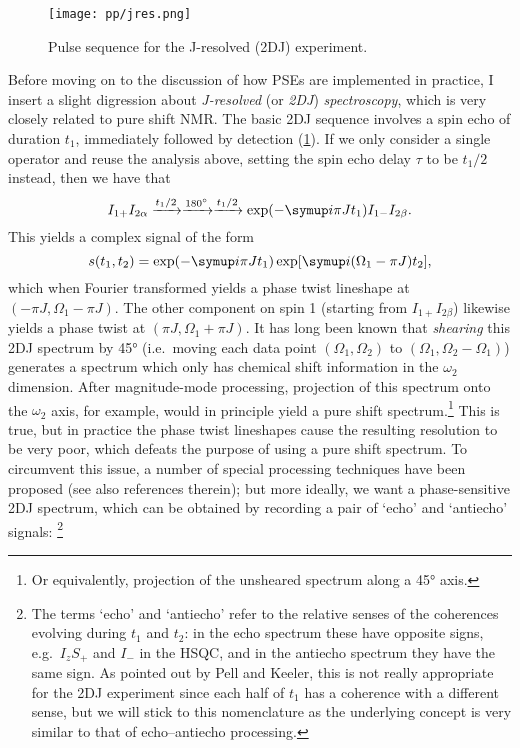 \begin{figure}[htb]
    \centering
    \texttt{[image: pp/jres.png]}%
    \caption[2DJ pulse sequence]{Pulse sequence for the J-resolved (2DJ) experiment.}
    \label{fig:pp_jres}
\end{figure}

Before moving on to the discussion of how PSEs are implemented in practice, I insert a slight digression about \textit{J-resolved} (or \textit{2DJ}) \textit{spectroscopy}, which is very closely related to pure shift NMR.
The basic 2DJ sequence involves a spin echo of duration $t_1$, immediately followed by detection (\cref{fig:pp_jres}).
If we only consider a single operator and reuse the analysis above, setting the spin echo delay $\tau$ to be $t_1/2$ instead, then we have that
\begin{equation}
    \label{eq:2dj_operator_analysis}
    I_{1+}I_{2\alpha} \xrightarrow[]{t_1/2} \xrightarrow[]{\ang{180}} \xrightarrow[]{t_1/2} \exp(-\mi \pi J t_1) I_{1-}I_{2\beta}.
\end{equation}
This yields a complex signal of the form
\begin{equation}
    \label{eq:2dj_signal}
    s(t_1, t_2) = \exp(-\mi\pi J t_1) \exp[\mi(\Omega_1 - \pi J) t_2],
\end{equation}
which when Fourier transformed yields a phase twist lineshape at $(-\pi J, \Omega_1 - \pi J)$.
The other component on spin 1 (starting from $I_{1+}I_{2\beta}$) likewise yields a phase twist at $(\pi J, \Omega_1 + \pi J)$.
It has long been known that \textit{shearing} this 2DJ spectrum by \ang{45} (i.e.\ moving each data point $(\Omega_1, \Omega_2)$ to $(\Omega_1, \Omega_2 - \Omega_1)$) generates a spectrum which only has chemical shift information in the $\omega_2$ dimension.
After magnitude-mode processing, projection of this spectrum onto the $\omega_2$ axis, for example, would in principle yield a pure shift spectrum.\footnote{Or equivalently, projection of the unsheared spectrum along a \ang{45} axis\autocite{Aue1976JCP}.}
This is true, but in practice the phase twist lineshapes cause the resulting resolution to be very poor, which defeats the purpose of using a pure shift spectrum.
To circumvent this issue, a number of special processing techniques have been proposed\autocite{Xu1991JMR,Nuzillard1996JMRSA,Simova1997JMR} (see also references therein); but more ideally, we want a phase-sensitive 2DJ spectrum, which can be obtained by recording a pair of `echo' and `antiecho' signals:%
\footnote{The terms `echo' and `antiecho' refer to the relative senses of the coherences evolving during $t_1$ and $t_2$: in the echo spectrum these have opposite signs, e.g.\ $I_zS_+$ and $I_-$ in the HSQC, and in the antiecho spectrum they have the same sign. As pointed out by Pell and Keeler\autocite{Pell2007JMR}, this is not really appropriate for the 2DJ experiment since each half of $t_1$ has a coherence with a different sense, but we will stick to this nomenclature as the underlying concept is very similar to that of echo--antiecho processing.}
